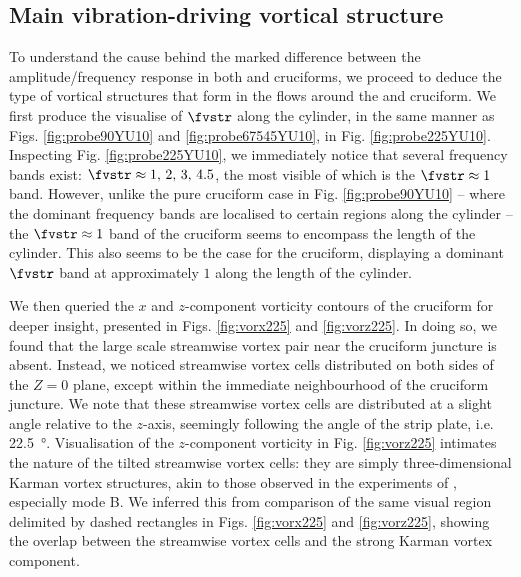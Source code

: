 \documentclass[a4paper,fleqn]{cas-sc}
\begin{document}
\subsection{Main vibration-driving vortical structure}\label{ssec:kvivRegimeVortStruct}
To understand the cause behind the marked difference between the amplitude/frequency response in both \angfo{} and \angth{} cruciforms, we proceed to deduce the type of vortical structures that form in the flows around the \angtw{} and \angon{} cruciform. We first produce the visualise of $\fvstr$ along the cylinder, in the same manner as Figs. \ref{fig:probe90YU10} and \ref{fig:probe67545YU10}, in Fig. \ref{fig:probe225YU10}. Inspecting Fig. \ref{fig:probe225YU10}, we immediately notice that several frequency bands exist: $\fvstr \approx 1,\, 2,\, 3,\, 4.5$, the most visible of which is the $\fvstr \approx 1$ band. However, unlike the pure cruciform case in Fig. \ref{fig:probe90YU10} -- where the dominant frequency bands are localised to certain regions along the cylinder -- the $\fvstr \approx 1$ band of the \angtw{} cruciform seems to encompass the length of the cylinder. This also seems to be the case for the \angon{} cruciform, displaying a dominant $\fvstr$ band at approximately $1$ along the length of the cylinder.

We then queried the $x$ and $z$-component vorticity contours of the \angtw{} cruciform for deeper insight, presented in Figs. \ref{fig:vorx225} and \ref{fig:vorz225}. In doing so, we found that the large scale streamwise vortex pair near the cruciform juncture is absent. Instead, we noticed streamwise vortex cells distributed on both sides of the $Z = 0$ plane, except within the immediate neighbourhood of the cruciform juncture. We note that these streamwise vortex cells are distributed at a slight angle relative to the $z$-axis, seemingly following the angle of the strip plate, i.e. \SI{22.5}{\degree}. Visualisation of the $z$-component vorticity in Fig. \ref{fig:vorz225} intimates the nature of the tilted streamwise vortex cells: they are simply three-dimensional Karman vortex structures, akin to those observed in the experiments of \citet{Williamson1996}, especially mode B. We inferred this from comparison of the same visual region delimited by dashed rectangles in Figs. \ref{fig:vorx225} and \ref{fig:vorz225}, showing the overlap between the streamwise vortex cells and the strong Karman vortex component.
\end{document}
